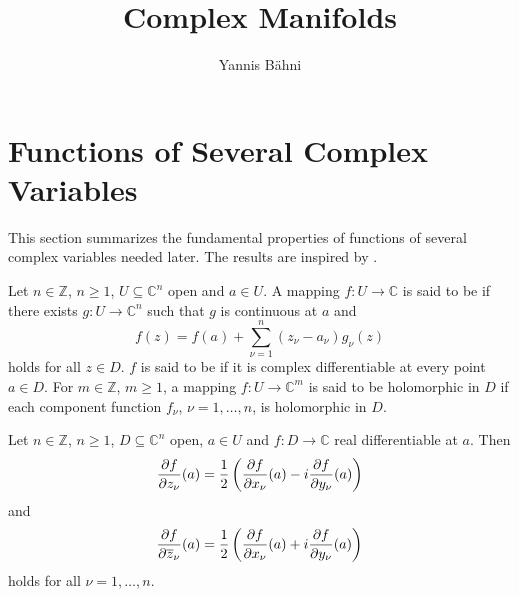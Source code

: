 
\newcommand{\Cscr}{\mathscr{C}}
\newcommand{\op}{\mathrm{op}}
\DeclareMathOperator\End{End}
\DeclareMathOperator\Hom{Hom}
\DeclareMathOperator\Mat{Mat}

\title{Complex Manifolds}
\author{Yannis B\"ahni}
\address[Yannis B\"ahni]{Universität Zürich, R\"amistrasse 71, 8006 Zurich}


\maketitle
\begin{abstract}

\end{abstract}

\tableofcontents

\section{Functions of Several Complex Variables}
This section summarizes the fundamental properties of functions of several complex variables needed later. The results are inspired by \cite[14--30]{grauert:complex_manifolds:2010}.

\begin{definition}
Let $n \in \mathbb{Z}$, $n \geq 1$, $U \subseteq \mathbb{C}^n$ open and $a \in U$. A mapping $f : U \to \mathbb{C}$ is said to be  if there exists $g : U \to \mathbb{C}^n$ such that $g$ is continuous at $a$ and
\begin{equation}
f(z) = f(a) + \sum_{\nu = 1}^n(z_\nu - a_\nu)g_\nu(z)
\end{equation} 
\noindent holds for all $z \in D$. $f$ is said to be  if it is complex differentiable at every point $a \in D$. For $m \in \mathbb{Z}$, $m \geq 1$, a mapping $f : U \to \mathbb{C}^m$ is said to be holomorphic in $D$ if each component function $f_\nu$, $\nu = 1,\dots,n$, is holomorphic in $D$.
\label{def:holomorphic}
\end{definition}

\begin{proposition}
Let $n \in \mathbb{Z}$, $n \geq 1$, $D \subseteq \mathbb{C}^n$ open, $a \in U$ and $f : D \to \mathbb{C}$ real differentiable at $a$. Then
\begin{equation}
\frac{\partial f}{\partial z_\nu}(a) = \frac{1}{2}\del[3]{\frac{\partial f}{\partial x_\nu}(a) - i \frac{\partial f}{\partial y_\nu}(a)} 
\end{equation}
\noindent and
\begin{equation}
\frac{\partial f}{\partial \overline{z}_\nu}(a) = \frac{1}{2}\del[3]{\frac{\partial f}{\partial x_\nu}(a) + i \frac{\partial f}{\partial y_\nu}(a)}
\end{equation}  
\noindent holds for all $\nu = 1,\dots,n$.
\label{prop:Wirtinger}
\end{proposition}

